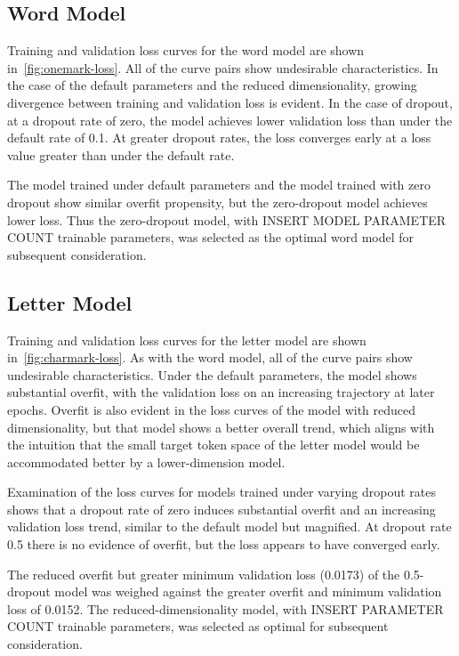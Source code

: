 \documentclass[letterpaper]{article} %
\begin{document}
\begin{NoHyper}
\subsection{Word Model}
\label{subsec:word}

Training and validation loss curves for the word model are shown in~\autoref{fig:onemark-loss}.
All of the curve pairs show undesirable characteristics.
In the case of the default parameters and the reduced dimensionality, growing divergence between training and validation loss is evident.
In the case of dropout, at a dropout rate of zero, the model achieves lower validation loss than under the default rate of 0.1. At greater dropout rates, the loss converges  early at a loss value greater than under the default rate.

The model trained under default parameters and the model trained with zero dropout show similar overfit propensity, but the zero-dropout model achieves lower loss.
Thus the zero-dropout model, with INSERT MODEL PARAMETER COUNT trainable parameters, was selected as the optimal word model for subsequent consideration.

\subsection{Letter Model}
\label{subsec:letter}

Training and validation loss curves for the letter model are shown in~\autoref{fig:charmark-loss}.
As with the word model, all of the curve pairs show undesirable characteristics.
Under the default parameters, the model shows substantial overfit, with the validation loss on an increasing trajectory at later epochs.
Overfit is also evident in the loss curves of the model with reduced dimensionality, but that model shows a better overall trend, which aligns with the intuition that the small target token space of the letter model would be accommodated better by a lower-dimension model.

Examination of the loss curves for models trained under varying dropout rates shows that a dropout rate of zero induces substantial overfit and an increasing validation loss trend, similar to the default model but magnified.
At dropout rate 0.5 there is no evidence of overfit, but the loss appears to have converged early.

The reduced overfit but greater minimum validation loss (0.0173) of the 0.5-dropout model was weighed against the greater overfit and minimum validation loss of 0.0152.
The reduced-dimensionality model, with INSERT PARAMETER COUNT trainable parameters, was selected as optimal for subsequent consideration.


\end{NoHyper}
\end{document}
